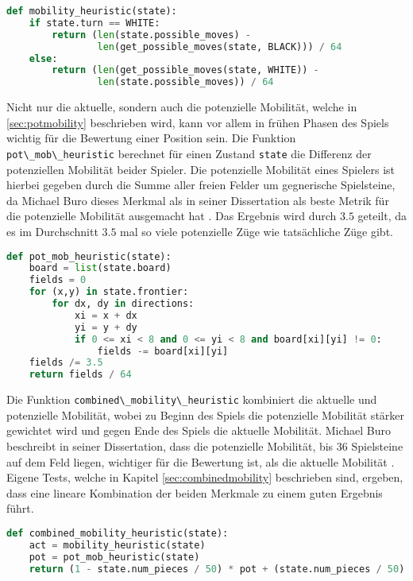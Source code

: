 \begin{lstlisting}[language=Python]
def mobility_heuristic(state):
    if state.turn == WHITE:
        return (len(state.possible_moves) -
                len(get_possible_moves(state, BLACK))) / 64
    else:
        return (len(get_possible_moves(state, WHITE)) -
                len(state.possible_moves)) / 64
\end{lstlisting}

Nicht nur die aktuelle, sondern auch die potenzielle Mobilität, welche
in \ref{sec:potmobility} beschrieben wird, kann vor allem in frühen
Phasen des Spiels wichtig für die Bewertung einer Position sein. Die
Funktion \passthrough{\lstinline!pot\_mob\_heuristic!} berechnet für
einen Zustand \passthrough{\lstinline!state!} die Differenz der
potenziellen Mobilität beider Spieler. Die potenzielle Mobilität eines
Spielers ist hierbei gegeben durch die Summe aller freien Felder um
gegnerische Spielsteine, da Michael Buro dieses Merkmal als in seiner
Dissertation als beste Metrik für die potenzielle Mobilität ausgemacht
hat \cite[S. 9]{evaluationfunctions}. Das Ergebnis wird durch \(3.5\)
geteilt, da es im Durchschnitt \(3.5\) mal so viele potenzielle Züge wie
tatsächliche Züge gibt.

\begin{lstlisting}[language=Python]
def pot_mob_heuristic(state):
    board = list(state.board)
    fields = 0
    for (x,y) in state.frontier:
        for dx, dy in directions:
            xi = x + dx
            yi = y + dy
            if 0 <= xi < 8 and 0 <= yi < 8 and board[xi][yi] != 0:
                fields -= board[xi][yi]
    fields /= 3.5 
    return fields / 64
\end{lstlisting}

Die Funktion \passthrough{\lstinline!combined\_mobility\_heuristic!}
kombiniert die aktuelle und potenzielle Mobilität, wobei zu Beginn des
Spiels die potenzielle Mobilität stärker gewichtet wird und gegen Ende
des Spiels die aktuelle Mobilität. Michael Buro beschreibt in seiner
Dissertation, dass die potenzielle Mobilität, bis 36 Spielsteine auf dem
Feld liegen, wichtiger für die Bewertung ist, als die aktuelle Mobilität
\cite[S. 9]{evaluationfunctions}. Eigene Tests, welche in Kapitel
\ref{sec:combinedmobility} beschrieben sind, ergeben, dass eine lineare
Kombination der beiden Merkmale zu einem guten Ergebnis führt.

\begin{lstlisting}[language=Python]
def combined_mobility_heuristic(state):
    act = mobility_heuristic(state)
    pot = pot_mob_heuristic(state)
    return (1 - state.num_pieces / 50) * pot + (state.num_pieces / 50) *  act
\end{lstlisting}

